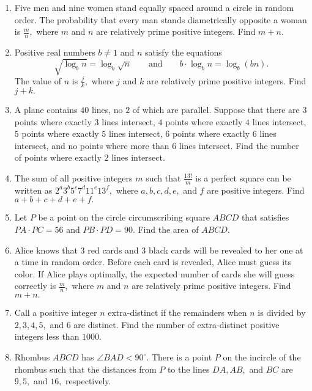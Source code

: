 \documentclass{article}
\begin{document}
\begin{enumerate}[label=\arabic*., itemsep=0.5em]\item Five men and nine women stand equally spaced around a circle in random order. The probability that every man stands diametrically opposite a woman is \(\frac{m}{n},\) where \(m\) and \(n\) are relatively prime positive integers. Find \(m+n.\)\par \vspace{0.5em}\item Positive real numbers \(b \not= 1\) and \(n\) satisfy the equations 
\begin{equation*}
\sqrt{\log_b n} = \log_b \sqrt{n} \qquad \text{and} \qquad b \cdot \log_b n = \log_b (bn).
\end{equation*}
 The value of \(n\) is \(\frac{j}{k},\) where \(j\) and \(k\) are relatively prime positive integers. Find \(j+k.\)\par \vspace{0.5em}\item A plane contains \(40\) lines, no \(2\) of which are parallel. Suppose that there are \(3\) points where exactly \(3\) lines intersect, \(4\) points where exactly \(4\) lines intersect, \(5\) points where exactly \(5\) lines intersect, \(6\) points where exactly \(6\) lines intersect, and no points where more than \(6\) lines intersect. Find the number of points where exactly \(2\) lines intersect.\par \vspace{0.5em}\item The sum of all positive integers \(m\) such that \(\frac{13!}{m}\) is a perfect square can be written as \(2^a3^b5^c7^d11^e13^f,\) where \(a,b,c,d,e,\) and \(f\) are positive integers. Find \(a+b+c+d+e+f.\)\par \vspace{0.5em}\item Let \(P\) be a point on the circle circumscribing square \(ABCD\) that satisfies \(PA \cdot PC = 56\) and \(PB \cdot PD = 90.\) Find the area of \(ABCD.\)\par \vspace{0.5em}\item Alice knows that \(3\) red cards and \(3\) black cards will be revealed to her one at a time in random order. Before each card is revealed, Alice must guess its color. If Alice plays optimally, the expected number of cards she will guess correctly is \(\frac{m}{n},\) where \(m\) and \(n\) are relatively prime positive integers. Find \(m+n.\)\par \vspace{0.5em}\item Call a positive integer \(n\) extra-distinct if the remainders when \(n\) is divided by \(2, 3, 4, 5,\) and \(6\) are distinct. Find the number of extra-distinct positive integers less than \(1000\).\par \vspace{0.5em}\item Rhombus \(ABCD\) has \(\angle BAD < 90^\circ.\) There is a point \(P\) on the incircle of the rhombus such that the distances from \(P\) to the lines \(DA,AB,\) and \(BC\) are \(9,5,\) and \(16,\) respectively. 
\end{enumerate}
\end{document}
